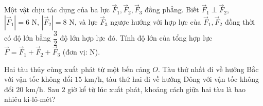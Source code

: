 \begin{bt}%
	Một vật chịu tác dụng của ba lực $\overrightarrow{F}_1, \overrightarrow{F}_2, \overrightarrow{F}_3$ đồng phẳng. Biết $\overrightarrow{F}_1\perp\overrightarrow{F}_2$, $|\overrightarrow{F}_1|=6\text{ N}$, $|\overrightarrow{F}_2|=8\text{ N}$, và lực $\overrightarrow{F}_3$ ngược hướng với hợp lực của $\overrightarrow{F}_1, \overrightarrow{F}_2$ đồng thời có độ lớn bằng $\dfrac{3}{2}$ độ lớn hợp lực đó. Tính độ lớn của tổng hợp lực $\overrightarrow{F}=\overrightarrow{F}_1+\overrightarrow{F}_2+\overrightarrow{F}_3$ (đơn vị: N).
\end{bt}

\begin{bt}%
	Hai tàu thủy cùng xuất phát từ một bến cảng $O$. Tàu thứ nhất đi về hướng Bắc với vận tốc không đổi $15\text{ km/h}$, tàu thứ hai đi về hướng Đông với vận tốc không đổi $20\text{ km/h}$. Sau $2$ giờ kể từ lúc xuất phát, khoảng cách giữa hai tàu là bao nhiêu ki-lô-mét?
\end{bt}
